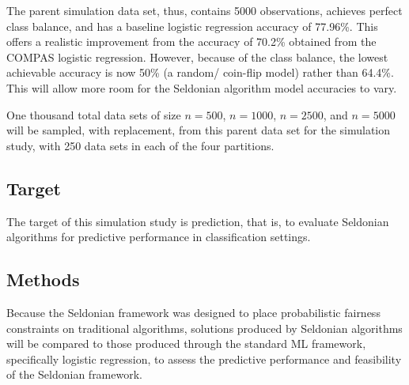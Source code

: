 \documentclass[12pt, twoside]{amherstthesis}
\begin{document}
The parent simulation data set, thus, contains 5000 observations, achieves perfect class balance, and has a baseline logistic regression accuracy of 77.96\%. This offers a realistic improvement from the accuracy of 70.2\% obtained from the COMPAS logistic regression. However, because of the class balance, the lowest achievable accuracy is now 50\% (a random/ coin-flip model) rather than 64.4\%. This will allow more room for the Seldonian algorithm model accuracies to vary.

One thousand total data sets of size \(n = 500\), \(n = 1000\), \(n = 2500\), and \(n = 5000\) will be sampled, with replacement, from this parent data set for the simulation study, with 250 data sets in each of the four partitions.

\hypertarget{target}{%
\subsection{Target}\label{target}}

The target of this simulation study is prediction, that is, to evaluate Seldonian algorithms for predictive performance in classification settings.

\hypertarget{methods}{%
\subsection{Methods}\label{methods}}

Because the Seldonian framework was designed to place probabilistic fairness constraints on traditional algorithms, solutions produced by Seldonian algorithms will be compared to those produced through the standard ML framework, specifically logistic regression, to assess the predictive performance and feasibility of the Seldonian framework.
\end{document}
